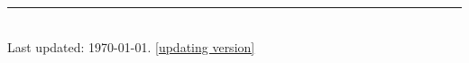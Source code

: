 \documentclass[11pt]{article} %
\begin{document}
%


\centering
\rule{0.25\linewidth}{0.4pt}\\
\medskip
Last updated: \today. \href{https://ynbsztl.github.io/ztlcv/CV_Tianlei.pdf}{[updating version]}
\end{document}
